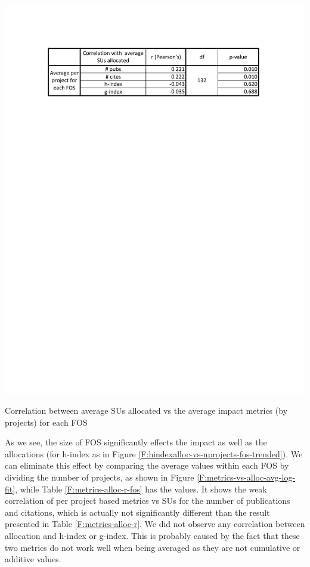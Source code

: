 \documentclass{sig-alternate}
\begin{document}
\begin{table}[!htb] 
  \centering 
    \includegraphics[width=1.0\columnwidth]{images/metrics_alloc_r_fos.pdf} 
  \caption{Correlation between average SUs allocated vs the average impact metrics (by projects) for each FOS}\label{F:metrics-alloc-r-fos} 
\end{table} 
 
As we see, the size of FOS significantly effects the impact as well as the allocations (for h-index as in Figure \ref{F:hindexalloc-vs-nprojects-fos-trended}). We can eliminate this effect by comparing the average values within each FOS by dividing the number of projects, as shown in Figure \ref{F:metrics-vs-alloc-avg-log-fit}, while Table \ref{F:metrics-alloc-r-fos} has the values. It shows the weak correlation of per project based metrics vs SUs for the number of publications and citations, which is actually not significantly different than the result presented in Table \ref{F:metrics-alloc-r}. We did not observe any correlation between allocation and h-index or g-index. This is probably caused by the fact that these two metrics do not work well when being averaged as they are not cumulative or additive values.
 
\end{document}
